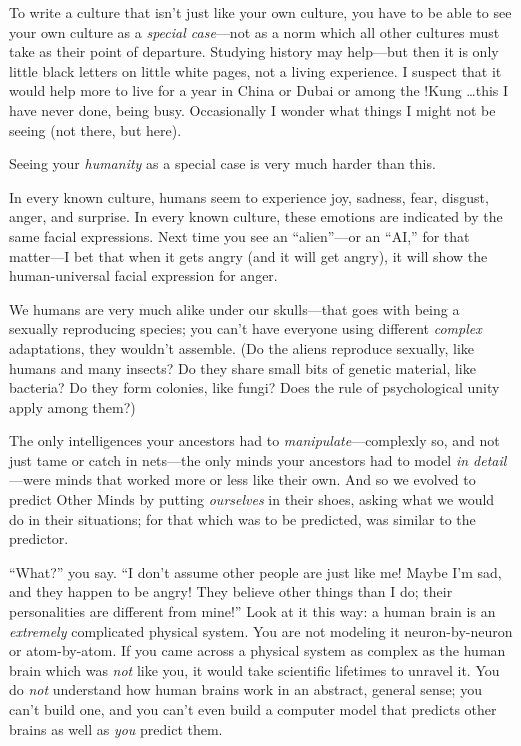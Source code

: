 {
 To write a culture that isn't just like your own
culture, you have to be able to see your own culture as a
\textit{special case}{}---not as a norm which all other cultures must
take as their point of departure. Studying history may help---but then
it is only little black letters on little white pages, not a living
experience. I suspect that it would help more to live for a year in
China or Dubai or among the !Kung \ldots this I have never done, being
busy. Occasionally I wonder what things I might not be seeing (not
there, but here).}

{
 Seeing your \textit{humanity} as a special case is very much
harder than this.}

{
 In every known culture, humans seem to experience joy, sadness,
fear, disgust, anger, and surprise. In every known culture, these
emotions are indicated by the same facial expressions. Next time you
see an ``alien''---or an
``AI,'' for that matter---I bet that
when it gets angry (and it will get angry), it will show the
human-universal facial expression for anger.}

{
 We humans are very much alike under our skulls---that goes with
being a sexually reproducing species; you can't have
everyone using different \textit{complex} adaptations, they
wouldn't assemble. (Do the aliens reproduce sexually,
like humans and many insects? Do they share small bits of genetic
material, like bacteria? Do they form colonies, like fungi? Does the
rule of psychological unity apply among them?)}

{
 The only intelligences your ancestors had to
\textit{manipulate}{}---complexly so, and not just tame or catch in
nets---the only minds your ancestors had to model \textit{in
detail}{}---were minds that worked more or less like their own. And so
we evolved to predict Other Minds by putting \textit{ourselves} in
their shoes, asking what we would do in their situations; for that
which was to be predicted, was similar to the predictor.}

{
 ``What?'' you say.
``I don't assume other people are just
like me! Maybe I'm sad, and they happen to be angry!
They believe other things than I do; their personalities are different
from mine!'' Look at it this way: a human brain is an
\textit{extremely} complicated physical system. You are not modeling it
neuron-by-neuron or atom-by-atom. If you came across a physical system
as complex as the human brain which was \textit{not} like you, it would
take scientific lifetimes to unravel it. You do \textit{not} understand
how human brains work in an abstract, general sense; you
can't build one, and you can't even
build a computer model that predicts other brains as well as
\textit{you} predict them.}

